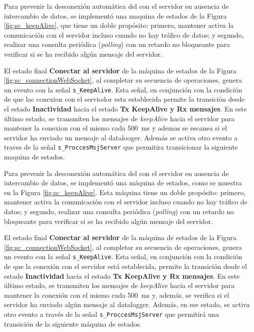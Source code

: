 Para prevenir la desconexión automática del con el servidor en ausencia de intercambio de datos, se implementó una maquina de estados de la Figura \ref{fig:sc_keepAlive}, que tiene un doble propósito: primero, mantener activa la comunicación con el servidor incluso cuando no hay tráfico de datos; y segundo, realizar una consulta periódica (\textit{polling}) con un retardo no bloqueante para verificar si se ha recibido algún mensaje del servidor.

El estado final \textbf{Conectar al servidor} de la máquina de estados de la Figura \ref{fig:sc_connectionWebSocket}, al completar su secuencia de operaciones, genera un evento con la señal \texttt{s\_KeepAlive}. Esta señal, en conjunción con la condición de que lac conexion con el serviodor esta establecida permite la transición desde el estado \textbf{Inactividad} hacia el estado \textbf{Tx KeepAlive y Rx mensajes}. En este último estado, se transmiten los mensajes de \textit{keepAlive} hacia el servidor para mantener la conexion con el mismo cada \SI{500}{\milli\second} y ademas se escanea si el servidor ha enviado un mensaje al datalooger. Además se activa otro evento a traves de la señal \texttt{s\_ProccesMsjServer} que permitira transicionar la siguiente maquina de estados.



Para prevenir la desconexión automática del con el servidor en ausencia de intercambio de datos, se implementó una máquina de estados, como se muestra en la Figura \ref{fig:sc_keepAlive}. Esta máquina tiene un doble propósito: primero, mantener activa la comunicación con el servidor incluso cuando no hay tráfico de datos; y segundo, realizar una consulta periódica (\textit{polling}) con un retardo no bloqueante para verificar si se ha recibido algún mensaje del servidor.

El estado final \textbf{Conectar al servidor} de la máquina de estados de la Figura \ref{fig:sc_connectionWebSocket}, al completar su secuencia de operaciones, genera un evento con la señal \texttt{s\_KeepAlive}. Esta señal, en conjunción con la condición de que la conexión con el servidor está establecida, permite la transición desde el estado \textbf{Inactividad} hacia el estado \textbf{Tx KeepAlive y Rx mensajes}. En este último estado, se transmiten los mensajes de \textit{keepAlive} hacia el servidor para mantener la conexión con el mismo cada \SI{500}{\milli\second} y, además, se verifica si el servidor ha enviado algún mensaje al datalogger. Además, en ese estado, se activa otro evento a través de la señal \texttt{s\_ProccesMsjServer} que permitirá una transición de la siguiente máquina de estados.


